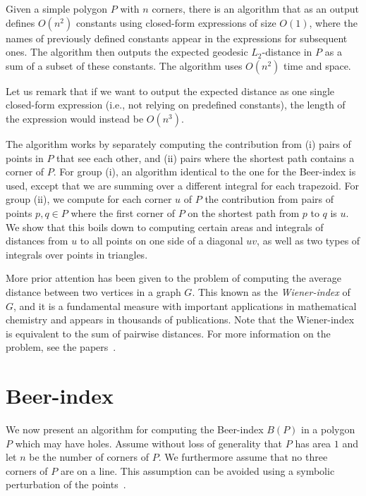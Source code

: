\documentclass{article}
\begin{document}
\begin{theorem}\label{thm:l2thm}
Given a simple polygon $P$ with $n$ corners, there is an algorithm that as an output defines $O(n^2)$ constants using closed-form expressions of size $O(1)$, where the names of previously defined constants appear in the expressions for subsequent ones.
The algorithm then outputs the expected geodesic $L_2$-distance in $P$ as a sum of a subset of these constants.
The algorithm uses $O(n^2)$ time and space.
\end{theorem}

Let us remark that if we want to output the expected distance as one single closed-form expression (i.e., not relying on predefined constants), the length of the expression would instead be $O(n^3)$.

The algorithm works by separately computing the contribution from (i) pairs of points in $P$ that see each other, and (ii) pairs where the shortest path contains a corner of $P$.
For group (i), an algorithm identical to the one for the Beer-index is used, except that we are summing over a different integral for each trapezoid.
For group (ii), we compute for each corner $u$ of $P$ the contribution from pairs of points $p,q\in P$ where the first corner of $P$ on the shortest path from $p$ to $q$ is $u$.
We show that this boils down to computing certain areas and integrals of distances from $u$ to all points on one side of a diagonal $uv$, as well as two types of integrals over points in triangles.

More prior attention has been given to the problem of computing the average distance between two vertices in a graph $G$.
This known as the \emph{Wiener-index} of $G$, and it is a fundamental measure with important applications in mathematical chemistry and appears in thousands of publications.
Note that the Wiener-index is equivalent to the sum of pairwise distances.
For more information on the problem, see the papers~\cite{DBLP:journals/talg/Cabello19, DBLP:conf/soda/GawrychowskiKMS18}.

\section{Beer-index}\label{sec:beer}
We now present an algorithm for computing the Beer-index $B(P)$ in a polygon $P$ which may have holes.
Assume without loss of generality that $P$ has area $1$ and let $n$ be the number of corners of $P$.
We furthermore assume that no three corners of $P$ are on a line.
This assumption can be avoided using a symbolic perturbation of the points~\cite{edelsbrunner1990simulation}.
\end{document}
